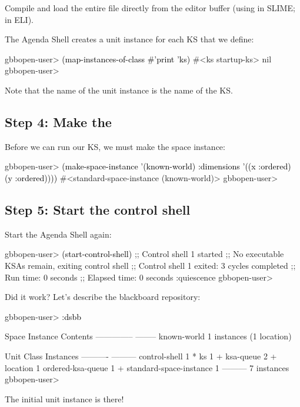 \documentclass[10pt,twoside,english,pdftex]{article}
\begin{document}
Compile and load the entire  file directly
from the editor buffer (using  in SLIME;  in ELI).

The Agenda Shell creates a  unit instance for each KS that we
define:
%
\W\supp
\begin{example}
\textcolor{darkergray}{%
  gbbopen-user> \textcolor{black}{(map-instances-of-class #'print 'ks)}
  #<ks startup-ks> 
  nil
  gbbopen-user>}
\end{example}
%
Note that the name of the  unit instance is the name of the KS.

\subsection*{Step 4: Make the }

Before we can run our KS, we must make the  space
instance:
%
\W\supp
\begin{example}
\textcolor{darkergray}{%
  gbbopen-user> \textcolor{black}{(make-space-instance '(known-world)
                          :dimensions '((x :ordered) (y :ordered))))}
  #<standard-space-instance (known-world)>
  gbbopen-user>}
\end{example}

\subsection*{Step 5: Start the control shell}

%
%
Start the Agenda Shell again:
%
\W\supp
\begin{example}
\textcolor{darkergray}{%
  gbbopen-user> \textcolor{black}{(start-control-shell)}
  ;; Control shell 1 started
  ;; No executable KSAs remain, exiting control shell
  ;; Control shell 1 exited: 3 cycles completed
  ;; Run time: 0 seconds
  ;; Elapsed time: 0 seconds
  :quiescence
  gbbopen-user>}
\end{example}

%
%
Did it work?  Let's describe the blackboard repository:
%
\W\supp
\begin{example}
\textcolor{darkergray}{%
  gbbopen-user> \textcolor{black}{:dsbb}
  
  Space Instance                Contents
  --------------                --------
  known-world                   1 instances (1 location)

  Unit Class                    Instances
  ----------                    ---------
  control-shell                         1 *
  ks                                    1 +
  ksa-queue                             2 +
  location                              1
  ordered-ksa-queue                     1 +
  standard-space-instance               1
                                ---------
                                        7 instances
  gbbopen-user>}
\end{example}
%
The initial  unit instance is there!
\end{document}
